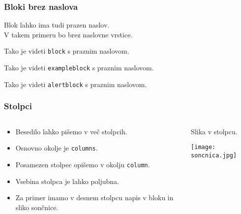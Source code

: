\documentclass{beamer}
\begin{document}

\begin{frame}
   \frametitle{Bloki brez naslova}
   Blok lahko ima tudi prazen naslov. \\
   V takem primeru bo brez naslovne vrstice.
   \begin{block}{}
      Tako je videti \texttt{block} s praznim naslovom.
   \end{block}
   \begin{exampleblock}{}
      Tako je videti \texttt{exampleblock} s praznim naslovom.
   \end{exampleblock}
   \begin{alertblock}{}
      Tako je videti \texttt{alertblock} s praznim naslovom.
   \end{alertblock}
\end{frame}


\begin{frame}
   \frametitle{Stolpci}
   \begin{columns}[t]
      \begin{column}{0.5\textwidth}
         \begin{itemize}
            \item Besedilo lahko pišemo v več stolpcih.
            \item Osnovno okolje je \texttt{columns}.
            \item Posamezen stolpec opišemo v okolju \texttt{column}.
            \item Vsebina stolpca je lahko poljubna.
            \item Za primer imamo v desnem stolpcu napis v bloku in sliko sončnice.
         \end{itemize}
      \end{column}
      \begin{column}{0.5\textwidth}
         \begin{exampleblock}{}
            \centering
            Slika v stolpcu.
         \end{exampleblock}
         \centering
         \texttt{[image: soncnica.jpg]}
      \end{column}
   \end{columns}
\end{frame}

\end{document}
